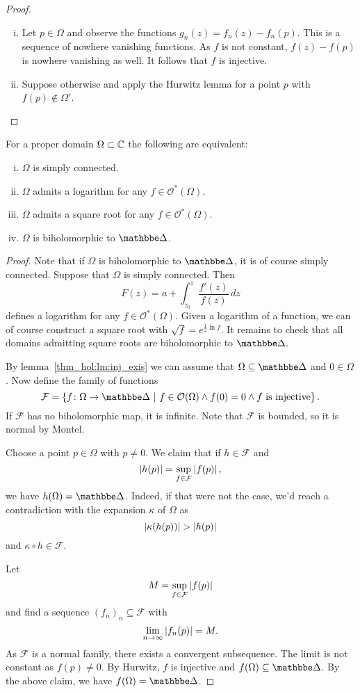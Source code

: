 \begin{proof}
\phantom{a}
\begin{enumerate}[i)]
\item Let $p \in \Omega$ and observe the functions
$g_n(z) = f_n(z) - f_n(p)$. This is a sequence of nowhere vanishing
functions. As $f$ is not constant, $f(z) - f(p)$ is nowhere
vanishing as well. It follows that $f$ is injective.
\item Suppose otherwise and apply the Hurwitz lemma for a point
$p$ with $f(p) \not \in \Omega'$. \qedhere
\end{enumerate}
\end{proof}

\begin{izrek}
For a proper domain $\Omega \subset \mathbb{C}$ the following are
equivalent:

\begin{enumerate}[i)]
\item $\Omega$ is simply connected.
\item $\Omega$ admits a logarithm for any
$f \in \mathcal{O}^*(\Omega)$.
\item $\Omega$ admits a square root for any
$f \in \mathcal{O}^*(\Omega)$.
\item $\Omega$ is biholomorphic to $\dsk$.
\end{enumerate}
\end{izrek}

\begin{proof}
Note that if $\Omega$ is biholomorphic to $\dsk$, it is of course
simply connected. Suppose that $\Omega$ is simply connected. Then
\[
F(z) = a + \int_{z_0}^z \frac{f'(z)}{f(z)}\,dz
\]
defines a logarithm for any $f \in \mathcal{O}^*(\Omega)$. Given a
logarithm of a function, we can of course construct a square root
with $\sqrt{f} = e^{\frac{1}{2} \ln f}$. It remains to check that
all domains admitting square roots are biholomorphic to $\dsk$.

By lemma~\ref{thm_hol:lm:inj_exis} we can assume that
$\Omega \subseteq \dsk$ and $0 \in \Omega$. Now define the family
of functions
\[
\mathcal{F} = \setb{f \colon \Omega \to \dsk}
{f \in \mathcal{O}(\Omega) \land
f(0) = 0 \land \text{$f$ is injective}}.
\]
If $\mathcal{F}$ has no biholomorphic map, it is infinite. Note
that $\mathcal{F}$ is bounded, so it is normal by Montel.

Choose a point $p \in \Omega$ with $p \ne 0$. We claim that if
$h \in \mathcal{F}$ and
\[
\left\lvert h(p)\right\rvert = \sup_{f \in \mathcal{F}} \left\lvert f(p)\right\rvert,
\]
we have $h(\Omega) = \dsk$. Indeed, if that were not the case, we'd
reach a contradiction with the expansion $\kappa$ of $\Omega$ as
\[
\left\lvert \kappa(h(p))\right\rvert > \left\lvert h(p)\right\rvert
\]
and $\kappa \circ h \in \mathcal{F}$.

Let
\[
M = \sup_{f \in \mathcal{F}} \left\lvert f(p)\right\rvert
\]
and find a sequence $(f_n)_n \subseteq \mathcal{F}$ with
\[
\lim_{n \to \infty} \left\lvert f_n(p)\right\rvert = M.
\]
As $\mathcal{F}$ is a normal family, there exists a convergent
subsequence. The limit is not constant as $f(p) \ne 0$. By Hurwitz,
$f$ is injective and $f(\Omega) \subseteq \dsk$. By the above
claim, we have $f(\Omega) = \dsk$.
\end{proof}

